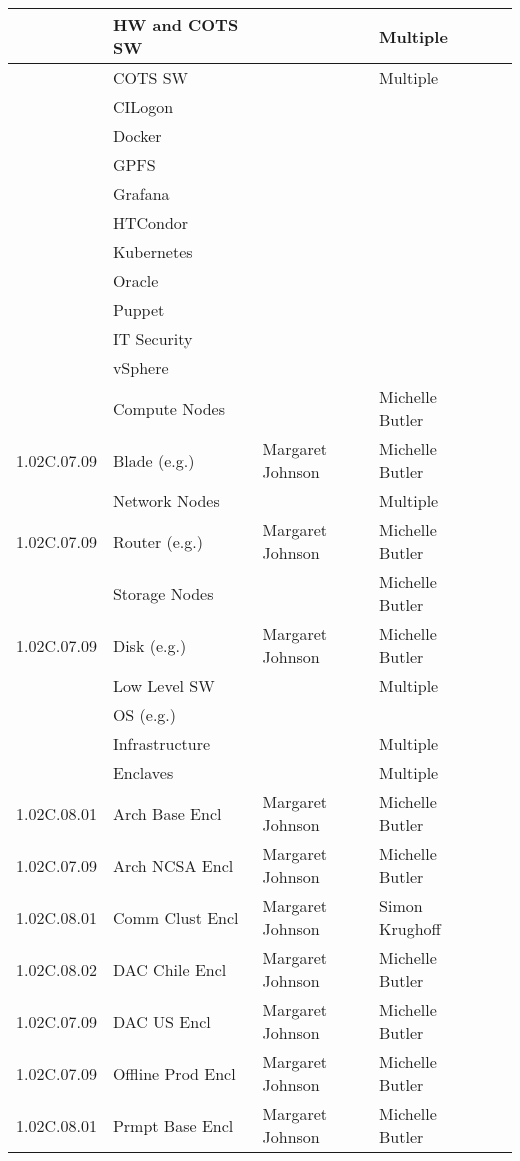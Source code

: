 \begin{longtable}{|p{}|p{}|p{}|p{}|p{}|p{}|}
 &  HW and COTS SW &  & Multiple & \\ \hline
 &  COTS SW &  & Multiple & \\ \hline
 &  CILogon &  &  & \\ \hline
 &  Docker &  &  & \\ \hline
 &  GPFS &  &  & \\ \hline
 &  Grafana &  &  & \\ \hline
 &  HTCondor &  &  & \\ \hline
 &  Kubernetes &  &  & \\ \hline
 &  Oracle &  &  & \\ \hline
 &  Puppet &  &  & \\ \hline
 &  IT Security &  &  & \\ \hline
 &  vSphere &  &  & \\ \hline
 &  Compute Nodes &  & Michelle Butler & \\ \hline
1.02C.07.09 &  Blade (e.g.) & Margaret Johnson & Michelle Butler & \\ \hline
 &  Network Nodes &  & Multiple & \\ \hline
1.02C.07.09 &  Router (e.g.) & Margaret Johnson & Michelle Butler & \\ \hline
 &  Storage Nodes &  & Michelle Butler & \\ \hline
1.02C.07.09 &  Disk (e.g.) & Margaret Johnson & Michelle Butler & \\ \hline
 &  Low Level SW &  & Multiple & \\ \hline
 &  OS (e.g.) &  &  & \\ \hline
 &  Infrastructure &  & Multiple & \\ \hline
 &  Enclaves &  & Multiple & \\ \hline
1.02C.08.01 &  Arch Base Encl & Margaret Johnson & Michelle Butler & \\ \hline
1.02C.07.09 &  Arch NCSA Encl & Margaret Johnson & Michelle Butler & \\ \hline
1.02C.08.01 &  Comm Clust Encl & Margaret Johnson & Simon Krughoff & \\ \hline
1.02C.08.02 &  DAC Chile Encl & Margaret Johnson & Michelle Butler & \\ \hline
1.02C.07.09 &  DAC US Encl & Margaret Johnson & Michelle Butler & \\ \hline
1.02C.07.09 &  Offline Prod Encl & Margaret Johnson & Michelle Butler & \\ \hline
1.02C.08.01 &  Prmpt Base Encl & Margaret Johnson & Michelle Butler & \\ \hline

\end{longtable}
